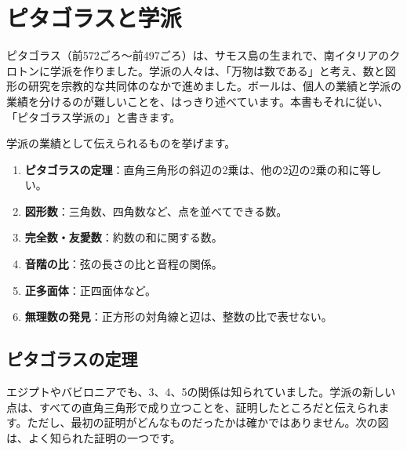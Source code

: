 \documentclass[a4paper,11pt,openany]{ltjsbook}
\begin{document}
\section{ピタゴラスと学派}

ピタゴラス（前572ごろ〜前497ごろ）は、サモス島の生まれで、南イタリアのクロトンに学派を作りました。学派の人々は、「万物は数である」と考え、数と図形の研究を宗教的な共同体のなかで進めました。ボールは、個人の業績と学派の業績を分けるのが難しいことを、はっきり述べています。本書もそれに従い、「ピタゴラス学派の」と書きます。

学派の業績として伝えられるものを挙げます。

\begin{enumerate}[leftmargin=*]
\item \textbf{ピタゴラスの定理}：直角三角形の斜辺の2乗は、他の2辺の2乗の和に等しい。
\item \textbf{図形数}：三角数、四角数など、点を並べてできる数。
\item \textbf{完全数・友愛数}：約数の和に関する数。
\item \textbf{音階の比}：弦の長さの比と音程の関係。
\item \textbf{正多面体}：正四面体など。
\item \textbf{無理数の発見}：正方形の対角線と辺は、整数の比で表せない。
\end{enumerate}

\subsection{ピタゴラスの定理}

エジプトやバビロニアでも、3、4、5の関係は知られていました。学派の新しい点は、すべての直角三角形で成り立つことを、証明したところだと伝えられます。ただし、最初の証明がどんなものだったかは確かではありません。次の図は、よく知られた証明の一つです。
\end{document}
